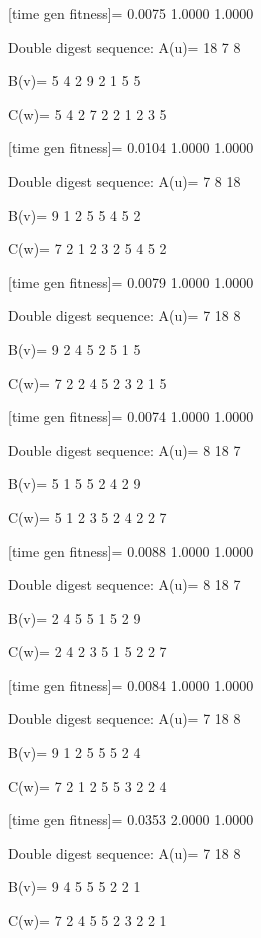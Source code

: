 [time gen fitness]=
    0.0075    1.0000    1.0000

Double digest sequence:
A(u)=
    18     7     8

B(v)=
     5     4     2     9     2     1     5     5

C(w)=
     5     4     2     7     2     2     1     2     3     5

[time gen fitness]=
    0.0104    1.0000    1.0000

Double digest sequence:
A(u)=
     7     8    18

B(v)=
     9     1     2     5     5     4     5     2

C(w)=
     7     2     1     2     3     2     5     4     5     2

[time gen fitness]=
    0.0079    1.0000    1.0000

Double digest sequence:
A(u)=
     7    18     8

B(v)=
     9     2     4     5     2     5     1     5

C(w)=
     7     2     2     4     5     2     3     2     1     5

[time gen fitness]=
    0.0074    1.0000    1.0000

Double digest sequence:
A(u)=
     8    18     7

B(v)=
     5     1     5     5     2     4     2     9

C(w)=
     5     1     2     3     5     2     4     2     2     7

[time gen fitness]=
    0.0088    1.0000    1.0000

Double digest sequence:
A(u)=
     8    18     7

B(v)=
     2     4     5     5     1     5     2     9

C(w)=
     2     4     2     3     5     1     5     2     2     7

[time gen fitness]=
    0.0084    1.0000    1.0000

Double digest sequence:
A(u)=
     7    18     8

B(v)=
     9     1     2     5     5     5     2     4

C(w)=
     7     2     1     2     5     5     3     2     2     4

[time gen fitness]=
    0.0353    2.0000    1.0000

Double digest sequence:
A(u)=
     7    18     8

B(v)=
     9     4     5     5     5     2     2     1

C(w)=
     7     2     4     5     5     2     3     2     2     1

